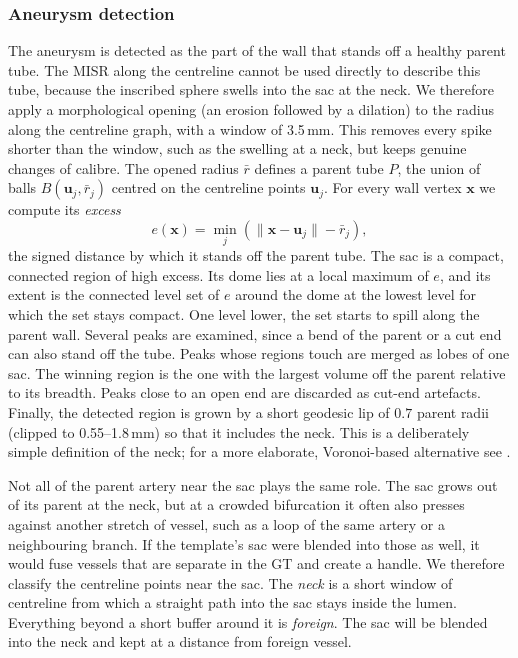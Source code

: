\subsubsection*{Aneurysm detection}

The aneurysm is detected as the part of the wall that stands off a healthy parent tube. The MISR along the centreline cannot be used directly to describe this tube, because the inscribed sphere swells into the sac at the neck. We therefore apply a morphological opening (an erosion followed by a dilation) to the radius along the centreline graph, with a window of 3.5\,mm. This removes every spike shorter than the window, such as the swelling at a neck, but keeps genuine changes of calibre. The opened radius $\bar{r}$ defines a parent tube $P$, the union of balls $B(\mathbf{u}_j, \bar{r}_j)$ centred on the centreline points $\mathbf{u}_j$. For every wall vertex $\mathbf{x}$ we compute its \emph{excess}
\begin{equation}
    e(\mathbf{x}) = \min_j \left( \lVert \mathbf{x} - \mathbf{u}_j \rVert - \bar{r}_j \right),
\end{equation}
the signed distance by which it stands off the parent tube. The sac is a compact, connected region of high excess. Its dome lies at a local maximum of $e$, and its extent is the connected level set of $e$ around the dome at the lowest level for which the set stays compact. One level lower, the set starts to spill along the parent wall. Several peaks are examined, since a bend of the parent or a cut end can also stand off the tube. Peaks whose regions touch are merged as lobes of one sac. The winning region is the one with the largest volume off the parent relative to its breadth. Peaks close to an open end are discarded as cut-end artefacts. Finally, the detected region is grown by a short geodesic lip of $0.7$ parent radii (clipped to 0.55--1.8\,mm) so that it includes the neck. This is a deliberately simple definition of the neck; for a more elaborate, Voronoi-based alternative see \citet{cardenes2011}.

Not all of the parent artery near the sac plays the same role. The sac grows out of its parent at the neck, but at a crowded bifurcation it often also presses against another stretch of vessel, such as a loop of the same artery or a neighbouring branch. If the template's sac were blended into those as well, it would fuse vessels that are separate in the GT and create a handle. We therefore classify the centreline points near the sac. The \emph{neck} is a short window of centreline from which a straight path into the sac stays inside the lumen. Everything beyond a short buffer around it is \emph{foreign}. The sac will be blended into the neck and kept at a distance from foreign vessel.


